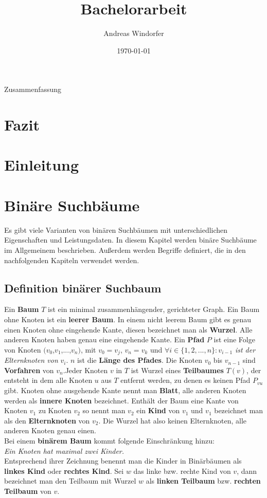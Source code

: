 \documentclass[a4paper,12pt]{article}
\title{Bachelorarbeit}
\author{
	Andreas Windorfer\\
}
\date{\today}
\begin{document}
\newtheorem{Lemma}{Lemma}[section]
\newtheorem{Satz}{Satz}[section]

\maketitle
\newpage
Zusammenfassung
\newpage
\tableofcontents
\newpage
\section{Fazit}
\newpage
\section{Einleitung}
\newpage
\section {Binäre Suchbäume}
Es gibt viele Varianten von binären Suchbäumen mit unterschiedlichen Eigenschaften und Leistungsdaten. In diesem Kapitel werden binäre Suchbäume im Allgemeinem beschrieben. Außerdem werden Begriffe definiert, die in den nachfolgenden Kapiteln verwendet werden. \\
\subsection{Definition binärer Suchbaum}
Ein \textbf{Baum} $T$ ist ein minimal zusammenhängender, gerichteter Graph. Ein Baum ohne Knoten ist ein \textbf{leerer Baum}. In einem nicht leerem Baum gibt es genau einen Knoten ohne eingehende Kante, diesen bezeichnet man als \textbf{Wurzel}. Alle anderen Knoten haben genau eine eingehende Kante.  Ein \textbf{Pfad} $P$ ist eine Folge von Knoten $(v_0$,$v_1$,...,$v_n)$, mit $v_0 = v_j$, $v_n = v_k$ und $\forall i \in \{ 1, 2,..., n \} \colon v_{i-1}$ \textit{ist der Elternknoten von} $v_i$. $n$ ist die \textbf{Länge des Pfades}. Die Knoten  $v_0$ bis $v_{n-1}$ sind \textbf{Vorfahren} von $v_n$.Jeder Knoten $v$ in $T$ ist Wurzel eines \textbf{Teilbaumes} $T(v)$, der entsteht in dem alle Knoten $u$ aus $T$ entfernt werden, zu denen es keinen Pfad $P_{vu}$ gibt.  Knoten ohne ausgehende Kante nennt man \textbf{Blatt}, alle anderen Knoten werden als \textbf{innere Knoten} bezeichnet. Enthält der Baum eine Kante von Knoten $v_1$ zu Knoten $v_2$ so nennt man $v_2$ ein \textbf{Kind} von $v_1$ und $v_1$ bezeichnet man als den  \textbf{Elternknoten} von $v_2$. Die Wurzel hat also keinen Elternknoten, alle anderen Knoten genau einen.\\
Bei einem \textbf{binärem Baum} kommt folgende Einschränkung hinzu:  \\
\textit{Ein Knoten hat maximal zwei Kinder.}\\ 
Entsprechend ihrer Zeichnung benennt man die Kinder in Binärbäumen als \textbf{linkes Kind} oder \textbf{rechtes Kind}. Sei $w$ das linke bzw. rechte Kind von $v$, dann bezeichnet man den Teilbaum mit Wurzel $w$ als \textbf{linken Teilbaum} bzw. \textbf{rechten Teilbaum}  von $v$.  
\end{document}
